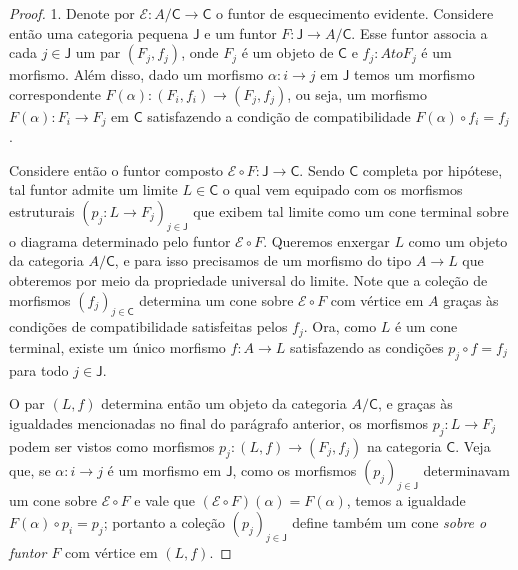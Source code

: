 \begin{proof}
  1. Denote por $\mathcal{E}: A / \mathsf{C} \to \mathsf{C}$ o funtor de esquecimento evidente.
  Considere então uma categoria pequena $\mathsf{J}$ e um funtor $F: \mathsf{J} \to A / \mathsf{C}$.
  Esse funtor associa a cada $j \in \mathsf{J}$ um par $(F_{j},f_{j})$, onde $F_{j}$ é um objeto de $\mathsf{C}$ e $f_{j}: A to F_{j}$ é um morfismo.
  Além disso, dado um morfismo $\alpha: i \to j$ em $\mathsf{J}$ temos um morfismo correspondente $F(\alpha): (F_{i},f_{i}) \to (F_{j},f_{j})$, ou seja, um morfismo $F(\alpha): F_{i} \to F_{j}$ em $\mathsf{C}$ satisfazendo a condição de compatibilidade $F(\alpha) \circ f_{i} = f_{j}$.

  Considere então o funtor composto $\mathcal{E} \circ F: \mathsf{J} \to \mathsf{C}$.
  Sendo $\mathsf{C}$ completa por hipótese, tal funtor admite um limite $L \in \mathsf{C}$ o qual vem equipado com os morfismos estruturais $(p_{j}: L \to F_{j})_{j \in \mathsf{J}}$ que exibem tal limite como um cone terminal sobre o diagrama determinado pelo funtor $\mathcal{E} \circ F$.
  Queremos enxergar $L$ como um objeto da categoria $A / \mathsf{C}$, e para isso precisamos de um morfismo do tipo $A \to L$ que obteremos por meio da propriedade universal do limite.
  Note que a coleção de morfismos $(f_{j})_{j \in \mathsf{C}}$ determina um cone sobre $\mathcal{E} \circ F$ com vértice em $A$ graças às condições de compatibilidade satisfeitas pelos $f_{j}$.
  Ora, como $L$ é um cone terminal, existe um único morfismo $f: A \to L$ satisfazendo as condições $p_{j} \circ f = f_{j}$ para todo $j \in \mathsf{J}$.

  O par $(L,f)$ determina então um objeto da categoria $A / \mathsf{C}$, e graças às igualdades mencionadas no final do parágrafo anterior, os morfismos $p_{j}: L \to F_{j}$ podem ser vistos como morfismos $p_{j}: (L,f) \to (F_{j},f_{j})$ na categoria $\mathsf{C}$.
  Veja que, se $\alpha: i \to j$ é um morfismo em $\mathsf{J}$, como os morfismos $(p_{j})_{j \in \mathsf{J}}$ determinavam um cone sobre $\mathcal{E} \circ F$ e vale que $(\mathcal{E} \circ F)(\alpha) = F(\alpha)$, temos a igualdade $F(\alpha) \circ p_{i} = p_{j}$; portanto a coleção $(p_{j})_{j \in \mathsf{J}}$ define também um cone \emph{sobre o funtor $F$} com vértice em $(L,f)$.


\end{proof}
